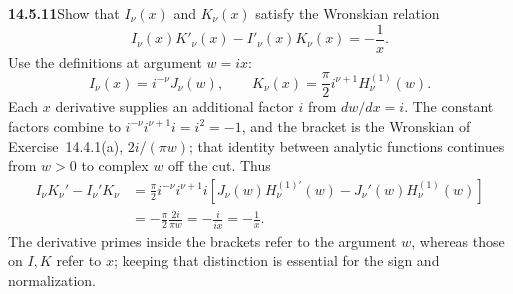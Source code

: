 \par\bigskip
\noindent\textbf{14.5.11}\quad Show that $I_{\nu}(x)$ and $K_{\nu}(x)$
satisfy the Wronskian relation
\[
I_{\nu}(x)K'_{\nu}(x)-I'_{\nu}(x)K_{\nu}(x)=-\frac{1}{x}.
\]
\solution
Use the definitions at argument $w=ix$:
\[
I_\nu(x)=i^{-\nu}J_\nu(w),\qquad
K_\nu(x)=\frac\pi2i^{\nu+1}H_\nu^{(1)}(w).
\]
Each $x$ derivative supplies an additional factor $i$ from
$dw/dx=i$. The constant factors combine to
$i^{-\nu}i^{\nu+1}i=i^2=-1$, and the bracket is the Wronskian of
Exercise~14.4.1(a), $2i/(\pi w)$; that identity between analytic
functions continues from $w>0$ to complex $w$ off the cut. Thus
\begin{align*}
I_\nu K_\nu'-I_\nu'K_\nu
&=\frac\pi2 i^{-\nu}i^{\nu+1}i
[J_\nu(w)H_\nu^{(1)\prime}(w)-J_\nu'(w)H_\nu^{(1)}(w)]\\
&=-\frac\pi2\frac{2i}{\pi w}
=-\frac i{ix}=\boxed{-\frac1x}.
\end{align*}
The derivative primes inside the brackets refer to the argument
$w$, whereas those on $I,K$ refer to $x$; keeping that distinction
is essential for the sign and normalization.

